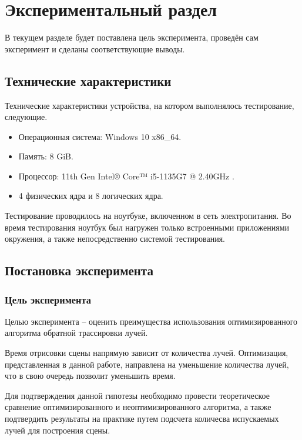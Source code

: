 \chapter{Экспериментальный раздел}
В текущем разделе будет поставлена цель эксперимента, проведён сам эксперимент и сделаны соответствующие выводы. 

\section{Технические характеристики}

Технические характеристики устройства, на котором выполнялось тестирование, следующие.

\begin{itemize}
	\item Операционная система: Windows 10 \cite{oswind} x86\_64.
	\item Память: 8 GiB.
	\item Процессор: 11th Gen Intel® Core™ i5-1135G7 @ 2.40GHz \cite{intel}.
	\item 4 физических ядра и 8 логических ядра.
\end{itemize}

Тестирование проводилось на ноутбуке, включенном в сеть электропитания. Во время тестирования ноутбук был нагружен только встроенными приложениями окружения, а также непосредственно системой тестирования.


\section{Постановка эксперимента} 

\subsection{Цель эксперимента}
Целью эксперимента -- оценить преимущества использования оптимизированного алгоритма обратной трассировки лучей.

Время отрисовки сцены напрямую зависит от количества лучей. Оптимизация, представленная в данной работе, направлена на уменьшение количества лучей, что в свою очередь позволит уменьшить время. 

Для подтверждения данной гипотезы необходимо провести теоретическое сравнение оптимизированного и неоптимизированного алгоритма, а также подтвердить результаты на практике путем подсчета количесва испускаемых лучей для построения сцены.

